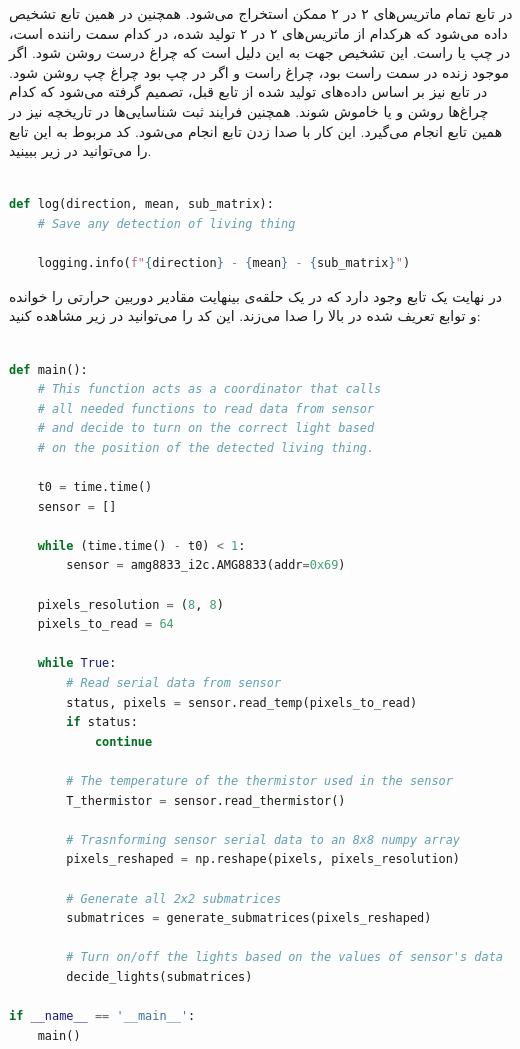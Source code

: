 در تابع  تمام ماتریس‌های ۲ در ۲ ممکن استخراج می‌شود. همچنین در همین تابع تشخیص داده می‌شود که هرکدام از ماتریس‌های ۲ در ۲ تولید شده، در کدام سمت راننده است، در چپ یا راست. این تشخیص جهت به این دلیل است که چراغ درست روشن شود. اگر موجود زنده در سمت راست بود، چراغ راست و اگر در چپ بود چراغ چپ روشن شود. در تابع  نیز بر اساس داده‌های تولید شده از تابع قبل، تصمیم گرفته می‌شود که کدام چراغ‌ها روشن و یا خاموش شوند. همچنین فرایند ثبت شناسایی‌ها در تاریخچه نیز در همین تابع انجام می‌گیرد. این کار با صدا زدن تابع  انجام می‌شود. کد مربوط به این تابع را می‌توانید در زیر ببینید.

\begin{latin}
\begin{lstlisting}[language=python]

def log(direction, mean, sub_matrix):
    # Save any detection of living thing 

    logging.info(f"{direction} - {mean} - {sub_matrix}")

\end{lstlisting}
\end{latin}

در نهایت یک تابع  وجود دارد که در یک حلقه‌ی بینهایت مقادیر دوربین حرارتی را خوانده و توابع تعریف شده در بالا را صدا می‌زند. این کد را می‌توانید در زیر مشاهده کنید:

\begin{latin}
\begin{lstlisting}[language=python]

def main():
    # This function acts as a coordinator that calls
    # all needed functions to read data from sensor
    # and decide to turn on the correct light based
    # on the position of the detected living thing.

    t0 = time.time()
    sensor = []

    while (time.time() - t0) < 1:
        sensor = amg8833_i2c.AMG8833(addr=0x69)

    pixels_resolution = (8, 8)
    pixels_to_read = 64

    while True:
        # Read serial data from sensor
        status, pixels = sensor.read_temp(pixels_to_read)
        if status:
            continue

        # The temperature of the thermistor used in the sensor
        T_thermistor = sensor.read_thermistor()

        # Trasnforming sensor serial data to an 8x8 numpy array
        pixels_reshaped = np.reshape(pixels, pixels_resolution)

        # Generate all 2x2 submatrices
        submatrices = generate_submatrices(pixels_reshaped)
        
        # Turn on/off the lights based on the values of sensor's data
        decide_lights(submatrices)

if __name__ == '__main__':
    main()

\end{lstlisting}
\end{latin}


